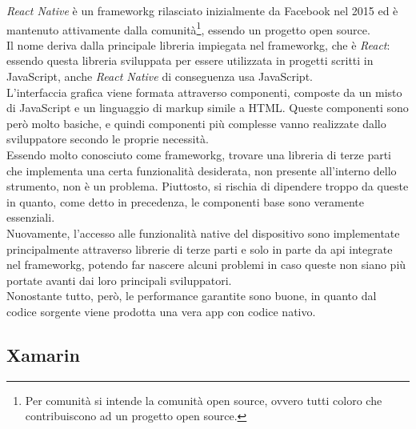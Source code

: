 \emph{React Native} è un \gls{frameworkg} rilasciato inizialmente da Facebook nel 2015 ed è mantenuto attivamente dalla comunità\footnote{Per comunità si intende la comunità open source, ovvero tutti coloro che contribuiscono ad un progetto open source.}, essendo un progetto open source.\\
Il nome deriva dalla principale libreria impiegata nel \gls{frameworkg}, che è \emph{React}: essendo questa libreria sviluppata per essere utilizzata in progetti scritti in JavaScript, anche \emph{React Native} di conseguenza usa JavaScript.\\
L'interfaccia grafica viene formata attraverso componenti, composte da un misto di JavaScript e un linguaggio di markup simile a HTML. Queste componenti sono però molto basiche, e quindi componenti più complesse vanno realizzate dallo sviluppatore secondo le proprie necessità.\\
Essendo molto conosciuto come \gls{frameworkg}, trovare una libreria di terze parti che implementa una certa funzionalità desiderata, non presente all'interno dello strumento, non è un problema. Piuttosto, si rischia di dipendere troppo da queste in quanto, come detto in precedenza, le componenti base sono veramente essenziali.\\
Nuovamente, l'accesso alle funzionalità native del dispositivo sono implementate principalmente attraverso librerie di terze parti e solo in parte da \gls{api} integrate nel \gls{frameworkg}, potendo far nascere alcuni problemi in caso queste non siano più portate avanti dai loro principali sviluppatori.\\
Nonostante tutto, però, le performance garantite sono buone, in quanto dal codice sorgente viene prodotta una vera app con codice nativo.

\subsection{Xamarin}
\label{subsec:xamarin}

